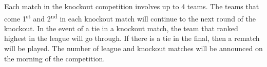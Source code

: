\begin{enumerate}
      Each match in the knockout competition involves up to 4 teams.
      The teams that come 1\textsuperscript{st} and 2\textsuperscript{nd} in each knockout match will continue to the next round of the knockout.
      In the event of a tie in a knockout match, the team that ranked highest in the league will go through.
      If there is a tie in the final, then a rematch will be played.
      The number of league and knockout matches will be announced on the morning of the competition.

\end{enumerate}
